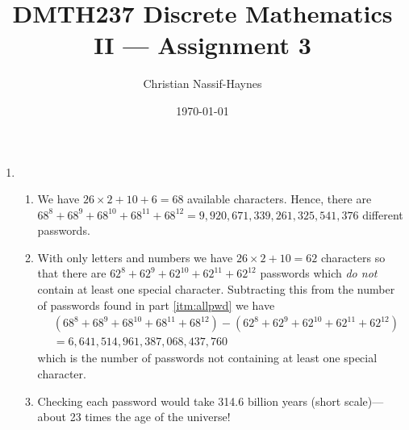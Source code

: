 \documentclass[a4paper,11pt]{article}
\begin{document}
	\title{DMTH237 Discrete Mathematics II --- Assignment 3}
	\author{Christian Nassif-Haynes}
	\date{\today}
	\maketitle
		
	\begin{enumerate}
		\item
		\begin{enumerate}
			\item \label{itm:allpwd} We have $26 \times 2 + 10 + 6 = 68$ available characters. Hence, there are $68^8 + 68^9 + 68^{10} + 68^{11} + 68^{12} = 9,920,671,339,261,325,541,376$ different passwords.
			
			\item \label{itm:atleastone} With only letters and numbers we have $26 \times 2 + 10 = 62$ characters so that there are $62^8 + 62^9 + 62^{10} + 62^{11} + 62^{12}$ passwords which {\it do not} contain at least one special character. Subtracting this from the number of passwords found in part \ref{itm:allpwd} we have
			\begin{align*}
				& (68^8 + 68^9 + 68^{10} + 68^{11} + 68^{12}) - (62^8 + 62^9 + 62^{10} + 62^{11} + 62^{12}) \\
				&= 6,641,514,961,387,068,437,760
			\end{align*}
			which is the number of passwords not containing at least one special character.
			
			\item Checking each password would take 314.6 billion years (short scale)---about 23 times the age of the universe!
		\end{enumerate}
		

\end{enumerate}
\end{document}
